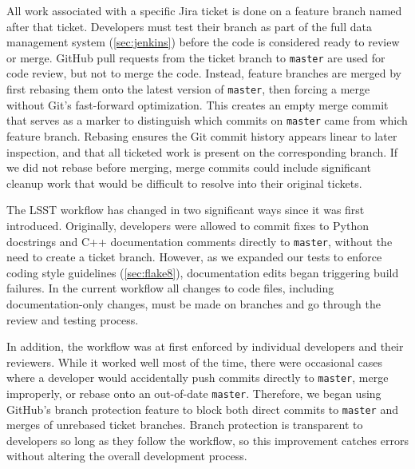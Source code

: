 All work associated with a specific Jira ticket is done on a feature branch named after that ticket.
Developers must test their branch as part of the full data management system (\autoref{sec:jenkins}) before the code is considered ready to review or merge.
GitHub pull requests from the ticket branch to \texttt{master} are used for code review, but not to merge the code.
Instead, feature branches are merged by first rebasing them onto the latest version of \texttt{master}, then forcing a merge without Git's fast-forward optimization.
This creates an empty merge commit that serves as a marker to distinguish which commits on \texttt{master} came from which feature branch.
Rebasing ensures the Git commit history appears linear to later inspection, and that all ticketed work is present on the corresponding branch.
If we did not rebase before merging, merge commits could include significant cleanup work that would be difficult to resolve into their original tickets.

The LSST workflow has changed in two significant ways since it was first introduced.
Originally, developers were allowed to commit fixes to Python docstrings and C++ documentation comments directly to \texttt{master}, without the need to create a ticket branch.
However, as we expanded our tests to enforce coding style guidelines (\autoref{sec:flake8}), documentation edits began triggering build failures.
In the current workflow all changes to code files, including documentation-only changes, must be made on branches and go through the review and testing process.

In addition, the workflow was at first enforced by individual developers and their reviewers.
While it worked well most of the time, there were occasional cases where a developer would accidentally push commits directly to \texttt{master}, merge improperly, or rebase onto an out-of-date \texttt{master}.
Therefore, we began using GitHub's branch protection feature to block both direct commits to \texttt{master} and merges of unrebased ticket branches.
Branch protection is transparent to developers so long as they follow the workflow, so this improvement catches errors without altering the overall development process.


